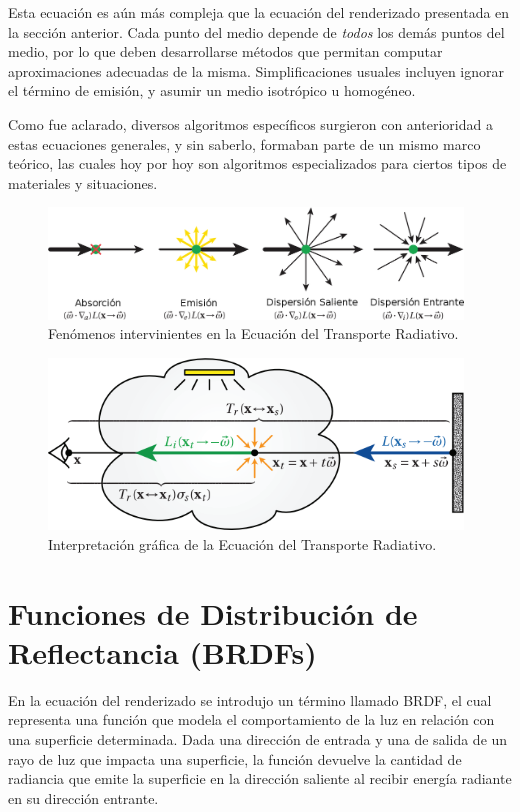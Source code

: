 Esta ecuación es aún más compleja que la ecuación del renderizado presentada en la sección anterior.
Cada punto del medio depende de {\em todos} los demás puntos del medio, por lo que deben desarrollarse métodos que permitan computar aproximaciones adecuadas de la misma.
Simplificaciones usuales incluyen ignorar el término de emisión, y asumir un medio isotrópico u homogéneo.

Como fue aclarado, diversos algoritmos específicos surgieron con anterioridad a estas ecuaciones generales, y sin saberlo, formaban parte de un mismo marco teórico, las cuales hoy por hoy son algoritmos especializados para ciertos tipos de materiales y situaciones.



\begin{figure}
\center
\includegraphics[width=11cm]{figures/fenomenosrte}
\caption{Fenómenos intervinientes en la Ecuación del Transporte Radiativo.}
\label{fg:fenomenosrte}
\end{figure}

\begin{figure}
\center
\includegraphics[width=11cm]{figures/rte}
\caption{Interpretación gráfica de la Ecuación del Transporte Radiativo.}
\label{fg:rte}
\end{figure}


\section{Funciones de Distribución de Reflectancia (BRDFs)}
En la ecuación del renderizado se introdujo un término llamado BRDF, el cual representa una función que modela el comportamiento de la luz en relación con una superficie determinada.
Dada una dirección de entrada y una de salida de un rayo de luz que impacta una superficie, la función devuelve la cantidad de radiancia que emite la superficie en la dirección saliente al recibir energía radiante en su dirección entrante.

